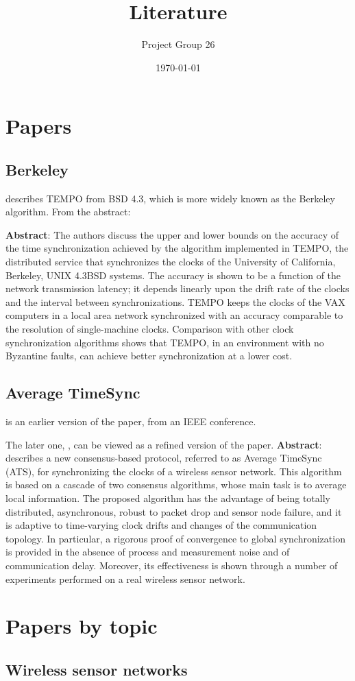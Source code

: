 \documentclass[11pt]{article}
\title{Literature}
\author{Project Group 26}
\date{\today}
\begin{document}
\section{Papers}

\subsection{Berkeley}
\cite{Gusella89} describes TEMPO from BSD 4.3, which is more widely known as the Berkeley algorithm.  From the abstract: 
\begin{quote}
    
\end{quote}

\textbf{Abstract}:
The authors discuss the upper and lower bounds on the accuracy of the time synchronization achieved by the algorithm implemented in TEMPO, the distributed service that synchronizes the clocks of the University of California, Berkeley, UNIX 4.3BSD systems. The accuracy is shown to be a function of the network transmission latency; it depends linearly upon the drift rate of the clocks and the interval between synchronizations. TEMPO keeps the clocks of the VAX computers in a local area network synchronized with an accuracy comparable to the resolution of single-machine clocks. Comparison with other clock synchronization algorithms shows that TEMPO, in an environment with no Byzantine faults, can achieve better synchronization at a lower cost.

\subsection{Average TimeSync}
\cite{SchenatoGamba2007} is an earlier version of the paper, from an IEEE conference.  

The later one, \cite{LucaFiorentin2011}, can be viewed as a refined version of the paper.  \textbf{Abstract}: describes a new consensus-based protocol, referred to as Average TimeSync (ATS), for
synchronizing the clocks of a wireless sensor network. This algorithm is based on a cascade of two
consensus algorithms, whose main task is to average local information. The proposed algorithm has the
advantage of being totally distributed, asynchronous, robust to packet drop and sensor node failure, and
it is adaptive to time-varying clock drifts and changes of the communication topology. In particular,
a rigorous proof of convergence to global synchronization is provided in the absence of process and
measurement noise and of communication delay. Moreover, its effectiveness is shown through a number
of experiments performed on a real wireless sensor network.

\section{Papers by topic}

\subsection{Wireless sensor networks}



\nocite{*}
\printbibliography
\end{document}

